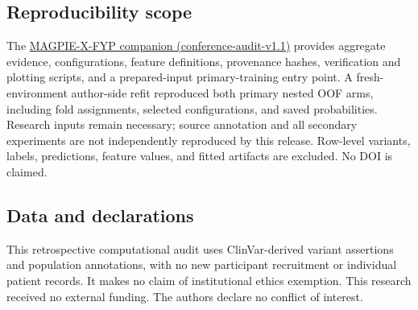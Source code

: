 \subsection{Reproducibility scope}
The \href{https://github.com/Shouwiya/MAGPIE-X-FYP/tree/conference-audit-v1.1/conference-audit}{MAGPIE-X-FYP companion (conference-audit-v1.1)} provides aggregate evidence, configurations, feature definitions, provenance hashes, verification and plotting scripts, and a prepared-input primary-training entry point. A fresh-environment author-side refit reproduced both primary nested OOF arms, including fold assignments, selected configurations, and saved probabilities. Research inputs remain necessary; source annotation and all secondary experiments are not independently reproduced by this release. Row-level variants, labels, predictions, feature values, and fitted artifacts are excluded. No DOI is claimed.

\subsection{Data and declarations}
This retrospective computational audit uses ClinVar-derived variant assertions and population annotations, with no new participant recruitment or individual patient records. It makes no claim of institutional ethics exemption. This research received no external funding. The authors declare no conflict of interest.
